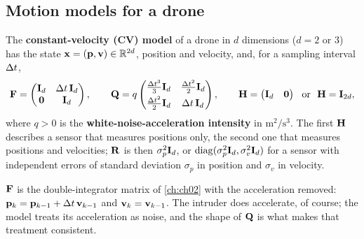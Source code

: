 \subsection{Motion models for a drone}
\label{sec:ch18-models}

\begin{definition}
\label{def:ch18-cv}
The \textbf{constant-velocity (CV) model} of a
drone in $d$ dimensions ($d=2$ or $3$) has the state $\mathbf{x}=(\mathbf{p},\mathbf{v})\in\mathbb{R}^{2d}$,
position and velocity, and, for a sampling interval $\Delta t$,
\begin{equation}
  \mathbf{F}=\begin{pmatrix}\mathbf{I}_d&\Delta t\,\mathbf{I}_d\\ \mathbf{0}&\mathbf{I}_d\end{pmatrix},\qquad
  \mathbf{Q}=q\begin{pmatrix}\tfrac{\Delta t^3}{3}\mathbf{I}_d&\tfrac{\Delta t^2}{2}\mathbf{I}_d\\[3pt] \tfrac{\Delta t^2}{2}\mathbf{I}_d&\Delta t\,\mathbf{I}_d\end{pmatrix},\qquad
  \mathbf{H}=\begin{pmatrix}\mathbf{I}_d&\mathbf{0}\end{pmatrix}\ \text{ or }\ \mathbf{H}=\mathbf{I}_{2d},
  \label{eq:ch18-cv}
\end{equation}
where $q>0$ is the \textbf{white-noise-acceleration intensity}
in $\mathrm{m^2/s^3}$. The first $\mathbf{H}$ describes a sensor that measures
positions only, the second one that measures positions and velocities;
$\mathbf{R}$ is then $\sigma_p^2\mathbf{I}_d$, or
$\operatorname{diag}(\sigma_p^2\mathbf{I}_d,\sigma_v^2\mathbf{I}_d)$ for a sensor with independent
errors of standard deviation $\sigma_p$ in position and $\sigma_v$ in velocity.
\end{definition}

$\mathbf{F}$ is the double-integrator matrix of \cref{ch:ch02} with the
acceleration removed: $\mathbf{p}_k=\mathbf{p}_{k-1}+\Delta t\,\mathbf{v}_{k-1}$ and
$\mathbf{v}_k=\mathbf{v}_{k-1}$. The intruder does accelerate, of course; the model treats
its acceleration as noise, and the shape of $\mathbf{Q}$ is what makes that
treatment consistent.

